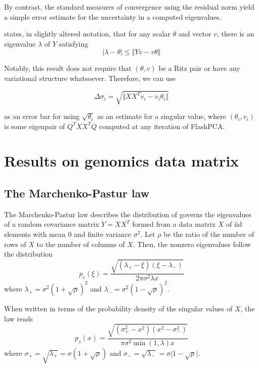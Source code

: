 \documentclass[final,leqno]{siamltex1213}
\begin{document}
By contrast, the standard measures of convergence using the residual norm yield
a simple error estimate for the uncertainty in a computed eigenvalues.

\cite[Theorem 4.5.1]{Parlett1998} states, in slightly altered notation, that for
any scalar $\theta$ and vector $v$, there is an eigenvalue $\lambda$ of $Y$ satisfying
\[
\vert\lambda - \theta\vert \le \Vert Y v - v \theta \Vert
\]

Notably, this result does not require that $(\theta, v)$ be a Ritz pair or have
any variational structure whatsoever. Therefore, we can use

\[
\Delta \sigma_i = \sqrt{\Vert X X^T v_i - v_i \theta_i \Vert}
\]

as an error bar for using $\sqrt{\theta_i}$ as an estimate for a singular value,
where $(\theta_i, v_i)$ is some eigenpair of $Q^T X X^T Q$ computed at any
iteration of FlashPCA.


\section{Results on genomics data matrix}


\subsection{The Marchenko-Pastur law}

The Marchenko-Pastur law describes the distribution of governs the eigenvalues
of a random covariance matrix $Y=XX^T$ formed from a data matrix $X$
of iid elements with mean 0 and finite variance $\sigma^2$.
Let $\rho$ be the ratio of the number of rows of $X$ to the number of columns of $X$.
Then, the nonzero eigenvalues follow the distribution
%
\begin{equation}
    p_e(\xi) = \frac {\sqrt{(\lambda_+-\xi)(\xi-\lambda_-)}} {2 \pi \sigma^2 \lambda x}
\end{equation}
%
where
$\lambda_+ = \sigma^2(1+\sqrt{\rho})^2$ and
$\lambda_- = \sigma^2(1-\sqrt{\rho})^2$.

When written in terms of the probability density of the singular values of $X$,
the law reads
%
\begin{equation}
    p_s(x) = \frac {\sqrt{(\sigma_+^2-x^2)(x^2-\sigma_-^2)}} {\pi \sigma^2 \min(1, \lambda) x}
\end{equation}
%
where
$\sigma_+ = \sqrt{\lambda_+} = \sigma(1+\sqrt{\rho})$ and
$\sigma_- = \sqrt{\lambda_-} = \sigma\vert1-\sqrt{\rho}\vert$.
\end{document}
